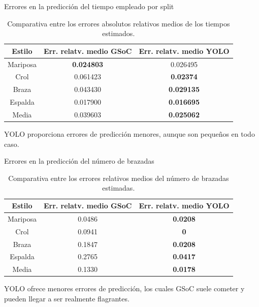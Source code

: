 \documentclass[11pt]{beamer}
\begin{document}
    \begin{frame}{Errores en la predicción del tiempo empleado por split}
        \begin{table}
            \centering
            \small
            \begin{tabular}{|c|c|c|} \hline
             Estilo & Err. relatv. medio GSoC & Err. relatv. medio YOLO  \\ \hline
             Mariposa & \textbf{0.024803} & 0.026495 \\
             Crol & 0.061423 & \textbf{0.02374}  \\   
             Braza & 0.043430 & \textbf{0.029135} \\
             Espalda & 0.017900 & \textbf{0.016695} \\
             Media & 0.039603 & \textbf{0.025062} \\ \hline
            \end{tabular}
            \caption{Comparativa entre los errores absolutos relativos medios de los tiempos estimados.}
            \label{tab:tablatiemposmedioscap5}
        \end{table}
        YOLO proporciona errores de predicción menores, aunque son pequeños en todo caso.
    \end{frame}
    
    \begin{frame}{Errores en la predicción del número de brazadas}
        \begin{table}
            \centering
            \begin{tabular}{|c|c|c|} \hline
             Estilo & Err. relatv. medio GSoC & Err. relatv. medio YOLO  \\ \hline
             Mariposa & 0.0486 & \textbf{0.0208} \\
             Crol & 0.0941 & \textbf{0}  \\   
             Braza & 0.1847 & \textbf{0.0208} \\
             Espalda & 0.2765 & \textbf{0.0417} \\
             Media & 0.1330 & \textbf{0.0178} \\ \hline
            \end{tabular}
            \caption{Comparativa entre los errores relativos medios del número de brazadas estimadas.}
            \label{tab:tablaerroresmediosbrazadas}
        \end{table}
        YOLO ofrece menores errores de predicción, los cuales GSoC suele cometer y pueden llegar a ser realmente flagrantes.
    \end{frame}
\end{document}
